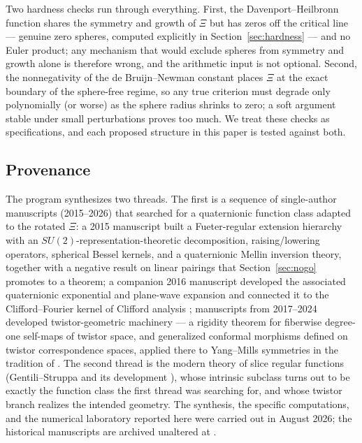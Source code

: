 \documentclass[11pt]{amsart}
\theoremstyle{plain}
\theoremstyle{definition}
\theoremstyle{remark}
\begin{document}
Two hardness checks run through everything. First, the Davenport--Heilbronn function
\cite{DavenportHeilbronn1936a,DavenportHeilbronn1936b,Titchmarsh1986} shares the symmetry and growth
of $\Xi$ but has zeros off the critical line --- genuine zero spheres, computed explicitly in
Section~\ref{sec:hardness} --- and no Euler product; any mechanism that would exclude spheres from
symmetry and growth alone is therefore wrong, and the arithmetic input is not optional. Second, the
nonnegativity of the de Bruijn--Newman constant \cite{RodgersTao2020} places $\Xi$ at the exact
boundary of the sphere-free regime, so any true criterion must degrade only polynomially (or worse)
as the sphere radius shrinks to zero; a soft argument stable under small perturbations proves too
much. We treat these checks as specifications, and each proposed structure in this paper is tested
against both.

\subsection*{Provenance}
The program synthesizes two threads. The first is a sequence of single-author manuscripts
(2015--2026) that searched for a quaternionic function class adapted to the rotated $\Xi$: a 2015
manuscript \cite{Baker2015} built a Fueter-regular extension hierarchy with an
$SU(2)$-representation-theoretic decomposition, raising/lowering operators, spherical Bessel
kernels, and a quaternionic Mellin inversion theory, together with a negative result on linear
pairings that Section~\ref{sec:nogo} promotes to a theorem; a companion 2016 manuscript
\cite{Baker2016} developed the associated quaternionic exponential and plane-wave expansion and
connected it to the Clifford--Fourier kernel of Clifford analysis
\cite{BrackxDeSchepperSommen2005,DeBieXu2011,BoryReyesShapiro2010}; manuscripts from 2017--2024
\cite{Baker2017,Baker2023,Baker2022arXiv,Baker2023arXiv} developed twistor-geometric machinery ---
a rigidity theorem for fiberwise degree-one self-maps of twistor space, and generalized conformal
morphisms defined on twistor correspondence spaces, applied there to Yang--Mills symmetries in the
tradition of \cite{MasonWoodhouse1996}. The
second thread is the modern theory of slice regular functions (Gentili--Struppa
\cite{GentiliStruppa2007} and its development
\cite{GentiliStoppato2008,CGSS2009,GSSbook,GhiloniPerotti2011}), whose intrinsic subclass turns out
to be exactly the function class the first thread was searching for, and whose twistor branch
\cite{GSS2014,Altavilla2018,AltavillaSarfatti2019} realizes the intended geometry. The synthesis,
the specific computations, and the numerical laboratory reported here were carried out in August
2026; the historical manuscripts are archived unaltered at \cite{ZenodoArchive}.
\end{document}
